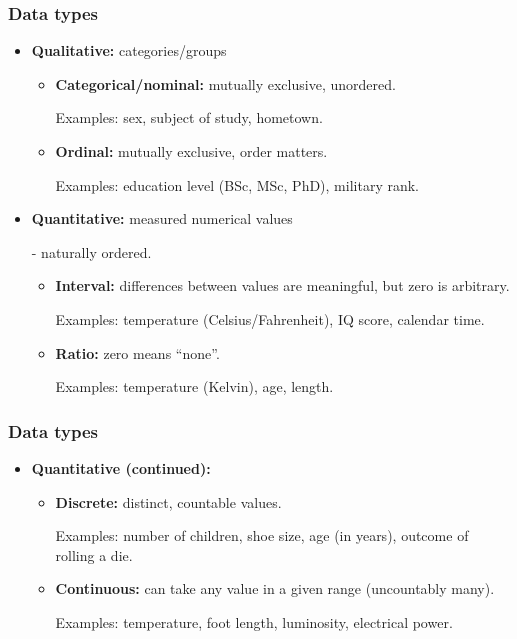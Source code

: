 \documentclass[t,8pt]{beamer}
\begin{document}
	\begin{frame}
		\frametitle{Data types}
		\begin{itemize}
			\item {\bf Qualitative:} categories/groups
			\begin{itemize}
				\item {\bf Categorical/nominal:} mutually exclusive, unordered. \par
				Examples: sex, subject of study, hometown.
				\item {\bf Ordinal:} mutually exclusive, order matters. \par
				Examples: education level (BSc, MSc, PhD), military rank.
			\end{itemize}
			\item {\bf Quantitative:} measured numerical values \par
			- naturally ordered.
			\begin{itemize}
				\item {\bf Interval:} differences between values are meaningful, but zero is arbitrary. \par
				Examples: temperature (Celsius/Fahrenheit), IQ score, calendar time.
				\item {\bf Ratio:} zero means ``none''. \par
				Examples: temperature (Kelvin), age, length.
			\end{itemize}
		\end{itemize}
	\end{frame}
	
	\begin{frame}
		\frametitle{Data types}
		\begin{itemize}
			\item {\bf Quantitative (continued):}
			\begin{itemize}
				\item {\bf Discrete:} distinct, countable values. \par
				Examples: number of children, shoe size, age (in years), outcome of rolling a die.
				\item {\bf Continuous:} can take any value in a given range (uncountably many). \par
				Examples: temperature, foot length, luminosity, electrical power.
			\end{itemize}
		\end{itemize}
	\end{frame}
	
\end{document}
